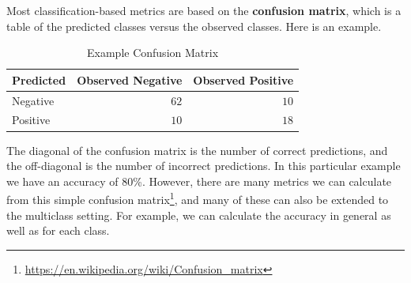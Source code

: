 \documentclass[
  letterpaper,
]{krantz}
\DeclareRobustCommand{\href}[2]{#2\footnote{\url{#1}}}
\begin{document}
Most classification-based metrics are based on the \textbf{confusion
matrix}, which is a table of the predicted classes versus the observed
classes. Here is an example.

\begin{longtable}{lrr}
\caption{Example Confusion Matrix}\tabularnewline

\toprule
Predicted & Observed Negative & Observed Positive \\ 
\midrule
Negative & $62$ & $10$ \\ 
Positive & $10$ & $18$ \\ 
\bottomrule
\end{longtable}

The diagonal of the confusion matrix is the number of correct
predictions, and the off-diagonal is the number of incorrect
predictions. In this particular example we have an accuracy of 80\%.
However, there are
\href{https://en.wikipedia.org/wiki/Confusion_matrix}{many metrics we
can calculate from this simple confusion matrix}, and many of these can
also be extended to the multiclass setting. For example, we can
calculate the accuracy in general as well as for each class.
\end{document}
